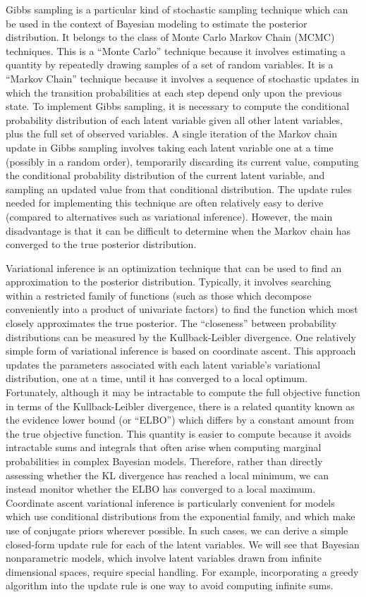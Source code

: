 \documentclass{article}
\begin{document}
Gibbs sampling is a particular kind of stochastic sampling technique which can be used in the context of Bayesian modeling to estimate the posterior distribution.
It belongs to the class of Monte Carlo Markov Chain (MCMC) techniques.
This is a ``Monte Carlo'' technique because it involves estimating a quantity by repeatedly drawing samples of a set of random variables.
It is a ``Markov Chain'' technique because it involves a sequence of stochastic updates in which the transition probabilities at each step depend only upon the previous state.
To implement Gibbs sampling, it is necessary to compute the conditional probability distribution of each latent variable given all other latent variables, plus the full set of observed variables.
A single iteration of the Markov chain update in Gibbs sampling involves taking each latent variable one at a time (possibly in a random order), temporarily discarding its current value, computing the conditional probability distribution of the current latent variable, and sampling an updated value from that conditional distribution.
The update rules needed for implementing this technique are often relatively easy to derive (compared to alternatives such as variational inference).
However, the main disadvantage is that it can be difficult to determine when the Markov chain has converged to the true posterior distribution.

Variational inference is an optimization technique that can be used to find an approximation to the posterior distribution.
Typically, it involves searching within a restricted family of functions (such as those which decompose conveniently into a product of univariate factors) to find the function which most closely approximates the true posterior.
The ``closeness'' between probability distributions can be measured by the Kullback-Leibler divergence.
One relatively simple form of variational inference is based on coordinate ascent.
This approach updates the parameters associated with each latent variable's variational distribution, one at a time, until it has converged to a local optimum.
Fortunately, although it may be intractable to compute the full objective function in terms of the Kullback-Leibler divergence, there is a related quantity known as the evidence lower bound (or ``ELBO'') which differs by a constant amount from the true objective function.
This quantity is easier to compute because it avoids intractable sums and integrals that often arise when computing marginal probabilities in complex Bayesian models.
Therefore, rather than directly assessing whether the KL divergence has reached a local minimum, we can instead monitor whether the ELBO has converged to a local maximum.
Coordinate ascent variational inference is particularly convenient for models which use conditional distributions from the exponential family, and which make use of conjugate priors wherever possible.
In such cases, we can derive a simple closed-form update rule for each of the latent variables.
We will see that Bayesian nonparametric models, which involve latent variables drawn from infinite dimensional spaces, require special handling.
For example, incorporating a greedy algorithm into the update rule is one way to avoid computing infinite sums.
\end{document}
